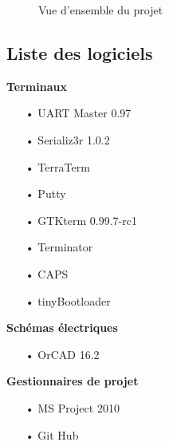 \documentclass[10pt,a4paper,final]{article}
\begin{document}
\begin{spacing}{1.5}
\begin{figure}[hbtp]
\caption{Vue d'ensemble du projet}
\centering
{}
\end{figure}
\vfill




\subsection{Liste des logiciels}
\begin{flushleft}
\HRule
\end{flushleft}
\begin{flushleft}

\begin{multicols}{3}

\textbf{Terminaux}
\begin{itemize}
\item[•]UART Master 0.97
\item[•]Serializ3r 1.0.2
\item[•]TerraTerm
\item[•]Putty
\item[•]GTKterm 0.99.7-rc1
\item[•]Terminator
\item[•]CAPS
\item[•]tinyBootloader
\end{itemize}

\textbf{Schémas électriques}
\begin{itemize}
\item[•]OrCAD 16.2
\end{itemize}

\textbf{Gestionnaires de projet}
\begin{itemize}
\item[•]MS Project 2010
\item[•]Git Hub
\end{itemize}


\end{multicols}
\end{flushleft}
\end{spacing}
\end{document}
